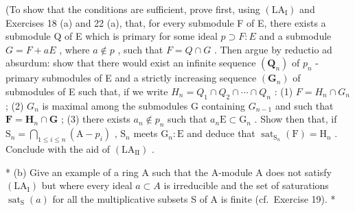 (To show that the conditions are sufficient, prove first, using \((\mathrm{LA}_{\mathrm{I}})\) and Exercises 18 (a) and 22 (a), that, for every submodule F of E, there exists a submodule Q of E which is primary for some ideal \(p \supset F: E\) and a submodule \(G = F + aE\) , where \(a \notin p\) , such that \(F = Q \cap G\) . Then argue by reductio ad absurdum: show that there would exist an infinite sequence \((\mathbf{Q}_{n})\) of \(p_{n}\) -primary submodules of E and a strictly increasing sequence \((\mathbf{G}_{n})\) of submodules of E such that, if we write \(H_{n} = Q_{1} \cap Q_{2} \cap \cdots \cap Q_{n}\) : (1) \(F = H_{n} \cap G_{n}\) ; (2) \(G_{n}\) is maximal among the submodules G containing \(G_{n-1}\) and such that \(\mathbf{F} = \mathbf{H}_n \cap \mathbf{G}\) ; (3) there exists \(a_n \notin p_n\) such that \(a_n \mathrm{E} \subset \mathrm{G}_n\) . Show then that, if \(\mathrm{S}_n = \bigcap_{1 \leqslant i \leqslant n} (\mathrm{A} - p_i)\) , \(\mathrm{S}_n\) meets \(\mathrm{G}_n: \mathrm{E}\) and deduce that \(\operatorname{sat}_{\mathrm{S}_n}(\mathrm{F}) = \mathrm{H}_n\) . Conclude with the aid of \((\mathrm{LA}_{\mathrm{II}})\) .

* (b) Give an example of a ring A such that the A-module A does not satisfy \((\mathrm{LA}_{\mathrm{I}})\) but where every ideal \(a \subset A\) is irreducible and the set of saturations \(\operatorname{sat}_{\mathrm{S}}(a)\) for all the multiplicative subsets S of A is finite (cf.~Exercise 19). *

